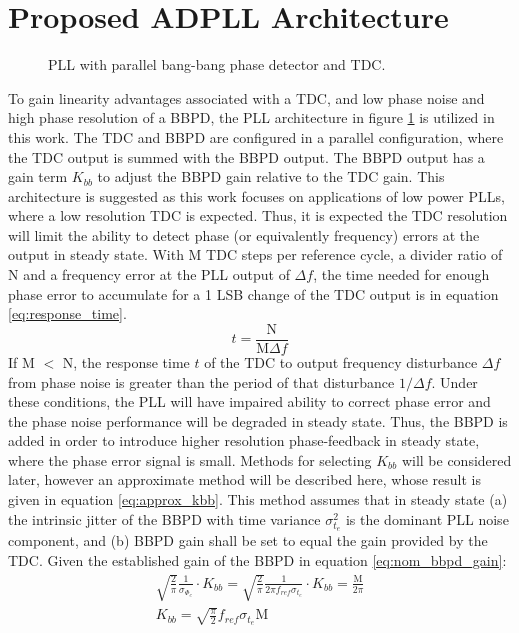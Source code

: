 

\section{Proposed ADPLL Architecture}\label{pll_arch}
\vspace{-2em}
\begin{figure}[htb!]
	\center
	\caption{PLL with parallel bang-bang phase detector and TDC.}
	\label{fig:tdc_bbpll}
\end{figure}
To gain linearity advantages associated with a TDC, and low phase noise and high phase resolution of a BBPD, the PLL architecture in figure \ref{fig:tdc_bbpll} is utilized in this work. The TDC and BBPD are configured in a parallel configuration, where the TDC output is summed with the BBPD output. The BBPD output has a gain term $K_{bb}$ to adjust the BBPD gain relative to the TDC gain. This architecture is suggested as this work focuses on applications of low power PLLs, where a low resolution TDC is expected. Thus, it is expected the TDC resolution will limit the ability to detect phase (or equivalently frequency) errors at the output in steady state. With M TDC steps per reference cycle, a divider ratio of N and a frequency error at the PLL output of $\Delta f$, the time needed for enough phase error to accumulate for a 1 LSB change of the TDC output is in equation \ref{eq:response_time}.
\begin{equation}\label{eq:response_time}
	t = \frac{\text{N}}{\text{M}\Delta f}
\end{equation}
If M $<$ N, the response time $t$ of the TDC to output frequency disturbance $\Delta f$ from phase noise is greater than the period of that disturbance $1/\Delta f$. Under these conditions, the PLL will have impaired ability to correct phase error and the phase noise performance will be degraded in steady state. Thus, the BBPD is added in order to introduce higher resolution phase-feedback in steady state, where the phase error signal is small. Methods for selecting $K_{bb}$ will be considered later, however an approximate method will be described here, whose result is given in equation \ref{eq:approx_kbb}. This method assumes that in steady state (a) the intrinsic jitter of the BBPD with time variance $\sigma^2_{t_e}$ is the dominant PLL noise component, and (b) BBPD gain shall be set to equal the gain provided by the TDC. Given the established gain of the BBPD in equation \ref{eq:nom_bbpd_gain}:
\begin{align}
	\sqrt{\frac{2}{\pi}}\frac{1}{\sigma_{\Phi_e}}\cdot K_{bb} = \sqrt{\frac{2}{\pi}}\frac{1}{2\pi f_{ref}\sigma_{t_e}}\cdot K_{bb} =  \frac{\mathrm{M}}{2\pi}\\
	K_{bb} = \sqrt{\frac{\pi}{2}}f_{ref}\sigma_{t_e}\mathrm{M}\label{eq:approx_kbb}
\end{align}

